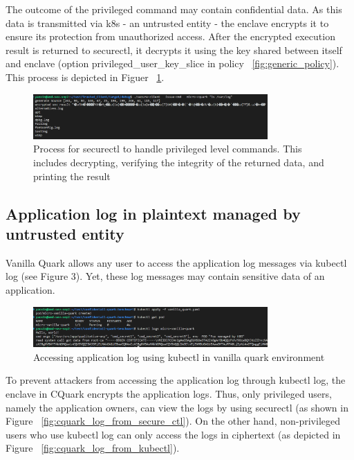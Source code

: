 The outcome of the privileged command may contain confidential data. As this data is transmitted via k8s - an untrusted entity - the enclave encrypts it to ensure its protection from unauthorized access. After the encrypted execution result is returned to securectl, it decrypts it 
using the key shared between itself and enclave (option privileged\_user\_key\_slice in policy ~\ref{fig:generic_policy}). This process is depicted in Figuer ~\ref{fig:cquark_priviled_cmd_result_protection}.

\begin{figure}[H]
    \centering
    \includegraphics[width=0.8\textwidth]{images/cquark_priviled_cmd_result_protection.png}
    \caption[Process for securectl to handle privileged level commands]{Process for securectl to handle privileged level commands. This includes decrypting, verifying the integrity of the returned data, and printing the result}
    \label{fig:cquark_priviled_cmd_result_protection}
\end{figure}

\subsection{Application log in plaintext managed by untrusted entity}
Vanilla Quark allows any user to access the application log messages via kubectl log (see Figure 3). 
Yet, these log messages may contain sensitive data of an application.
\begin{figure}[H]
    \centering
    \includegraphics[width=0.8\textwidth]{images/vanilla_queak_app_log.png}
    \caption[Accessing application log using kubectl in vanilla quark environment]{Accessing application log using kubectl in vanilla quark environment}
    \label{fig:vanilla_queak_app_log}
\end{figure}

To prevent attackers from accessing the application log through kubectl log, the enclave in CQuark encrypts the application logs. Thus, only privileged users, namely the application owners, can view the logs by using securectl (as shown in Figure ~\ref{fig:cquark_log_from_secure_ctl}).
 On the other hand, non-privileged users who use kubectl log can only access the logs in ciphertext (as depicted in Figure ~\ref{fig:cquark_log_from_kubectl}).

